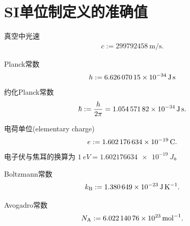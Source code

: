 \section{SI单位制定义的准确值}
\begin{compactitem}
	\item 真空中光速
		\begin{align}
			c := \qty{299792458}{\metre\per\second}.
		\end{align}
	\item Planck常数
		\begin{align}
			h := \qty{6.62607015E-34}{\joule\second}
		\end{align}
		约化Planck常数
		\begin{align}
			\hbar := \frac{h}{2\pi} = \qty{1.05457182E-34}{\joule\second}.
		\end{align}
	\item 电荷单位(elementary charge)
		\begin{align}
			e := \qty{1.602176634E-19}{C}.
		\end{align}
		电子伏与焦耳的换算为 $\qty{1}{eV} = \qty{1.602176634e-19}{J}$。
	\item Boltzmann常数
		\begin{align}
			k_{\mathrm{B}} := \qty{1.380649E-23}{\joule\per\kelvin}.
		\end{align}
	\item Avogadro常数
		\begin{align}
			N_{\mathrm{A}} := \qty{6.02214076E23}{\per\mole}.
		\end{align}
\end{compactitem}
